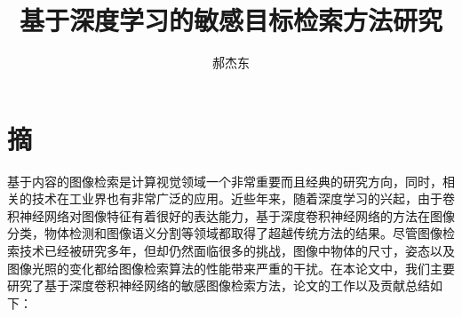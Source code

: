 

\confidential{} %
\title[基于深度学习的敏感目标检索方法研究]{基于深度学习的敏感目标检索方法研究}
\author{郝杰东} %
\advisorsec{} %



\maketitle
\makeenglishtitle

\makedeclaration

\chapter*{摘}
\setcounter{page}{1}%
基于内容的图像检索是计算视觉领域一个非常重要而且经典的研究方向，同时，相关的技术在工业界也有非常广泛的应用。近些年来，随着深度学习的兴起，由于卷积神经网络对图像特征有着很好的表达能力，基于深度卷积神经网络的方法在图像分类，物体检测和图像语义分割等领域都取得了超越传统方法的结果。尽管图像检索技术已经被研究多年，但却仍然面临很多的挑战，图像中物体的尺寸，姿态以及图像光照的变化都给图像检索算法的性能带来严重的干扰。在本论文中，我们主要研究了基于深度卷积神经网络的敏感图像检索方法，论文的工作以及贡献总结如下：

